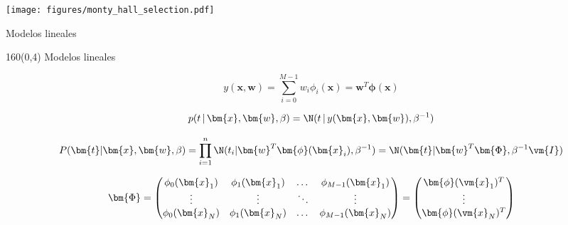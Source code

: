 \documentclass[shownotes,aspectratio=169]{beamer}
\begin{document}
\begin{frame}[plain]

\vspace{0.75cm}
\centering
\texttt{[image: figures/monty\_hall\_selection.pdf]} \hspace{1cm}

\end{frame}

\begin{frame}[plain]

\centering

\Large Modelos lineales

\end{frame}

\begin{frame}[plain]
\begin{textblock}{160}(0,4)
\centering \Large Modelos lineales
\end{textblock}
 \vspace{1.25cm}
 
\begin{equation*}
y(\bm{x},\bm{w}) = \sum_{i=0}^{M-1} w_i \phi_i(\bm{x}) = \bm{w}^T \bm{\phi}(\bm{x})
\end{equation*}

\vspace{0.5cm}
\pause
% 
 
 \begin{equation*}
p(t \, | \, \bm{x}, \bm{w}, \beta) = \N(t \, | \, y(\bm{x},\bm{w}) , \beta^{-1})
\end{equation*}
\vspace{0.025cm}
\pause
 
\begin{equation*}
P(\bm{t} | \bm{x}, \bm{w}, \beta) = \prod_{i=1}^n \N(t_i | \bm{w}^T \bm{\phi}(\bm{x}_i) , \beta^{-1}) = \N(\bm{t}|\bm{w}^T \bm{\Phi}, \beta^{-1} \vm{I})
\end{equation*}
\vspace{0.05cm}
\pause

\begin{equation*}
 \bm{\Phi} =
  \begin{pmatrix}
    \phi_0(\bm{x}_1) & \phi_1(\bm{x}_1) & \dots & \phi_{M-1}(\bm{x}_1)\\
    \vdots & \vdots & \ddots & \vdots \\
    \phi_0(\bm{x}_N) & \phi_1(\bm{x}_N) & \dots & \phi_{M-1}(\bm{x}_N)
  \end{pmatrix}
  = 
  \begin{pmatrix}
   \bm{\phi}(\vm{x}_1)^T \\
   \vdots \\
   \bm{\phi}(\vm{x}_N)^T \\
  \end{pmatrix}
\end{equation*}

 
\end{frame}
\end{document}
